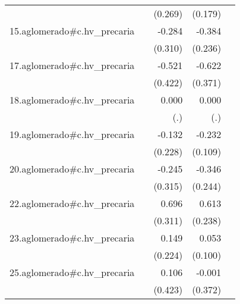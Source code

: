 {\begin{longtable}{l*{4}{D{.}{.}{-1}}}
            &                     &     (0.269)         &     (0.179)         &                     \\
\addlinespace
15.aglomerado#c.hv\_precaria&                     &      -0.284         &      -0.384         &                     \\
            &                     &     (0.310)         &     (0.236)         &                     \\
\addlinespace
17.aglomerado#c.hv\_precaria&                     &      -0.521         &      -0.622         &                     \\
            &                     &     (0.422)         &     (0.371)         &                     \\
\addlinespace
18.aglomerado#c.hv\_precaria&                     &       0.000         &       0.000         &                     \\
            &                     &         (.)         &         (.)         &                     \\
\addlinespace
19.aglomerado#c.hv\_precaria&                     &      -0.132         &      -0.232\sym{*}  &                     \\
            &                     &     (0.228)         &     (0.109)         &                     \\
\addlinespace
20.aglomerado#c.hv\_precaria&                     &      -0.245         &      -0.346         &                     \\
            &                     &     (0.315)         &     (0.244)         &                     \\
\addlinespace
22.aglomerado#c.hv\_precaria&                     &       0.696\sym{*}  &       0.613\sym{**} &                     \\
            &                     &     (0.311)         &     (0.238)         &                     \\
\addlinespace
23.aglomerado#c.hv\_precaria&                     &       0.149         &       0.053         &                     \\
            &                     &     (0.224)         &     (0.100)         &                     \\
\addlinespace
25.aglomerado#c.hv\_precaria&                     &       0.106         &      -0.001         &                     \\
            &                     &     (0.423)         &     (0.372)         &                     \\

\end{longtable}}
